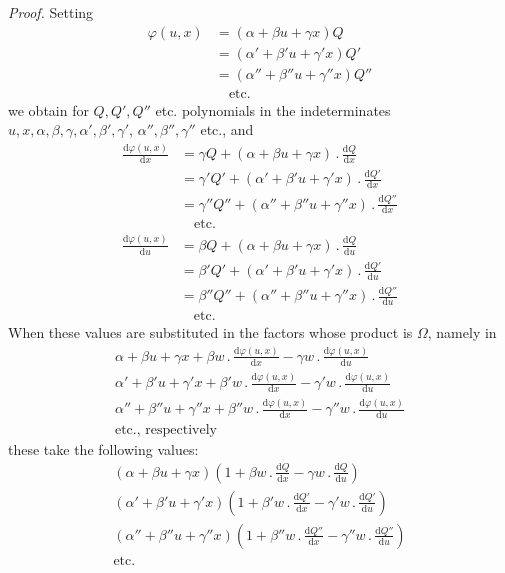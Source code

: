 \textit{Proof.} Setting
\[
\begin{aligned}
\varphi(u,x)&=(\alpha+\beta u+\gamma x)Q\\
&=(\alpha'+\beta'u+\gamma'x)Q'\\
&=(\alpha''+\beta''u+\gamma''x)Q''\\
&\quad\text{etc.}
\end{aligned}
\]
we obtain for $Q,Q',Q''$ etc. polynomials in the indeterminates $u,\allowbreak x,\allowbreak \alpha,\allowbreak \beta,\allowbreak \gamma,\allowbreak \alpha',\allowbreak \beta',\allowbreak \gamma'$, $\alpha'',\beta'',\gamma''$ etc., and
\[
\begin{aligned}
\frac{\mathrm d\varphi(u,x)}{\mathrm dx}&=\gamma Q+(\alpha+\beta u+\gamma x)\, .\,\frac{\mathrm dQ}{\mathrm dx}\\
&=\gamma'Q'+(\alpha'+\beta'u+\gamma'x)\, .\,\frac{\mathrm dQ'}{\mathrm dx}\\
&=\gamma''Q''+(\alpha''+\beta''u+\gamma''x)\, .\,\frac{\mathrm dQ''}{\mathrm dx}\\
&\quad\text{etc.}
\end{aligned}
\]
\[
\begin{aligned}
\frac{\mathrm d\varphi(u,x)}{\mathrm du}&=\beta Q+(\alpha+\beta u+\gamma x)\, .\,\frac{\mathrm dQ}{\mathrm du}\\
&=\beta'Q'+(\alpha'+\beta'u+\gamma'x)\, .\,\frac{\mathrm dQ'}{\mathrm du}\\
&=\beta''Q''+(\alpha''+\beta''u+\gamma''x)\, .\,\frac{\mathrm dQ''}{\mathrm du}\\
&\quad\text{etc.}
\end{aligned}
\]
When these values are substituted in the factors whose product is $\Omega$, namely in
\[
\begin{gathered}
\alpha+\beta u+\gamma x+\beta w\, .\,\frac{\mathrm d\varphi(u,x)}{\mathrm dx}-\gamma w\, .\,\frac{\mathrm d\varphi(u,x)}{\mathrm du}\\
\alpha'+\beta'u+\gamma'x+\beta'w\, .\,\frac{\mathrm d\varphi(u,x)}{\mathrm dx}-\gamma'w\, .\,\frac{\mathrm d\varphi(u,x)}{\mathrm du}\\
\alpha''+\beta''u+\gamma''x+\beta''w\, .\,\frac{\mathrm d\varphi(u,x)}{\mathrm dx}-\gamma''w\, .\,\frac{\mathrm d\varphi(u,x)}{\mathrm du}\\
\text{etc., respectively}
\end{gathered}
\]
these take the following values:
\[
\begin{gathered}
(\alpha+\beta u+\gamma x)(1+\beta w\, .\,\tfrac{\mathrm dQ}{\mathrm dx}-\gamma w\, .\,\tfrac{\mathrm dQ}{\mathrm du})\\
(\alpha'+\beta'u+\gamma'x)(1+\beta'w\, .\,\tfrac{\mathrm dQ'}{\mathrm dx}-\gamma'w\, .\,\tfrac{\mathrm dQ'}{\mathrm du})\\
(\alpha''+\beta''u+\gamma''x)(1+\beta''w\, .\,\tfrac{\mathrm dQ''}{\mathrm dx}-\gamma''w\, .\,\tfrac{\mathrm dQ''}{\mathrm du})\\
\text{etc.}
\end{gathered}
\]
